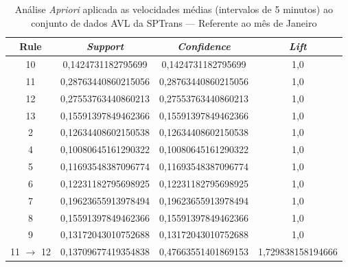 \documentclass[
	12pt,				%
	oneside,			%
	a4paper,			%
	english,			%
	brazil				%
	]{abntex2ppgsi}
\begin{document}
{{\begin{apendicesenv}
\begin{table}[!htb]
\centering
\caption {Análise \textit{Apriori} aplicada as velocidades médias (intervalos de 5 minutos) ao conjunto de dados AVL da SPTrans --- Referente ao mês de Janeiro}
\label {tab:aprioriJanuary}
\begin{tabular}{c|c|c|c}
\hline
\textbf{Rule} & \textit{\textbf{Support}} & \textit{\textbf{Confidence}} & \textit{\textbf{Lift}} \\
\hline
10 &  0,1424731182795699 &  0,1424731182795699 &  1,0\\
\hline
11 &  0,28763440860215056 &  0,28763440860215056 &  1,0\\
\hline
12 &  0,27553763440860213 &  0,27553763440860213 &  1,0\\
\hline
13 &  0,15591397849462366 &  0,15591397849462366 &  1,0\\
\hline
2 &  0,12634408602150538 &  0,12634408602150538 &  1,0\\
\hline
4 &  0,10080645161290322 &  0,10080645161290322 &  1,0\\
\hline
5 &  0,11693548387096774 &  0,11693548387096774 &  1,0\\
\hline
6 &  0,12231182795698925 &  0,12231182795698925 &  1,0\\
\hline
7 &  0,19623655913978494 &  0,19623655913978494 &  1,0\\
\hline
8 &  0,15591397849462366 &  0,15591397849462366 &  1,0\\
\hline
9 &  0,13172043010752688 &  0,13172043010752688 &  1,0\\
\hline
11 $\rightarrow$ 12 &  0,13709677419354838 &  0,47663551401869153 &  1,729838158194666\\
\hline
\end{tabular}
\end{table}


\end{apendicesenv}}}
\end{document}

